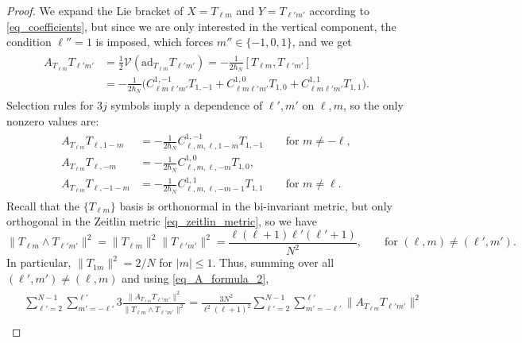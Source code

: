 \documentclass[11pt]{amsart}
\numberwithin{equation}{section}
\theoremstyle{definition}
\newcommand{\ad}{\mathrm{ad}}
\begin{document}
\begin{proof}
We expand the Lie bracket of $X = T_{\ell m}$ and $Y = T_{\ell'm'}$ according to  \eqref{eq_coefficients}, but since we are only interested in the vertical component, the condition $\ell'' = 1$ is imposed, which forces  $m''\in\{-1,0,1\}$, and we get 
\begin{gather}\label{eq_A_formula_1}
\begin{split}
A_{T_{\ell m}}T_{\ell' m'} &= \frac{1}{2}\mathcal{V} (\ad_{T_{\ell m}} T_{\ell'm'})  =-\frac{1}{2\hbar_N} 
[T_{\ell m}, T_{\ell' m'}] \\
&= -\frac{1}{2\hbar_N}\Big(C_{\ell m\ell' m'}^{1,-1}T_{1,-1} + C_{\ell m\ell' m'}^{1,0}T_{1,0} + C_{\ell m\ell' m'}^{1,1}T_{1,1}\Big).
\end{split}
\end{gather}
Selection rules for $3j$ symbols imply a dependence of $\ell', m'$ on $\ell, m$, so the only nonzero values are:
\begin{gather}\label{eq_A_formula_2}
\begin{split}
A_{T_{\ell m}}T_{\ell, 1-m}
&=
-\tfrac{1}{2\hbar_N}C_{\ell,m,\ell,1-m}^{1,-1}T_{1,-1} \qquad \text{for $m \neq -\ell$}, \\
A_{T_{\ell m}}T_{\ell, -m} 
&=
-\tfrac{1}{2\hbar_N}C_{\ell,m,\ell,-m}^{1,0}T_{1,0}, \\
A_{T_{\ell m}}T_{\ell, -1-m}
&=
-\tfrac{1}{2\hbar_N}C_{\ell,m,\ell,-m-1}^{1,1}T_{1,1} \qquad \text{for $m \neq \ell$}.
\end{split}
\end{gather}
Recall that the $\{ T_{\ell m} \}$ basis is orthonormal in the bi-invariant metric, but only orthogonal in the Zeitlin metric \eqref{eq_zeitlin_metric}, so we have \begin{equation*}
\| T_{\ell m} \wedge T_{\ell' m'} \|^2 = \|T_{\ell m}\|^2\|T_{\ell'm'}\|^2 = \frac{\ell(\ell+1)\ell'(\ell'+1)}{N^2}, \qquad \text{for $(\ell, m) \neq (\ell',m')$}.
\end{equation*}
In particular, $\|T_{1m}\|^2 = 2/N$ for $|m| \leq 1$. Thus, summing over all $(\ell', m') \neq (\ell, m)$ and using \eqref{eq_A_formula_2},
\begin{gather*}
\begin{split}
&\sum\limits_{\ell' = 2}^{N-1}
\sum\limits_{m' = -\ell'}^{\ell'} 3\frac{\|A_{T_{\ell m}}T_{\ell'm'}\|^2}{\|T_{\ell m} \wedge T_{\ell'm'}\|^2}
=
\frac{3N^2}{\ell^2(\ell+1)^2} \sum\limits_{\ell' = 2}^{N-1}
\sum\limits_{m' = -\ell'}^{\ell'} \|A_{T_{\ell m}}T_{\ell'm'}\|^2 \\

\end{split}
\end{gather*}
\end{proof}
\end{document}
